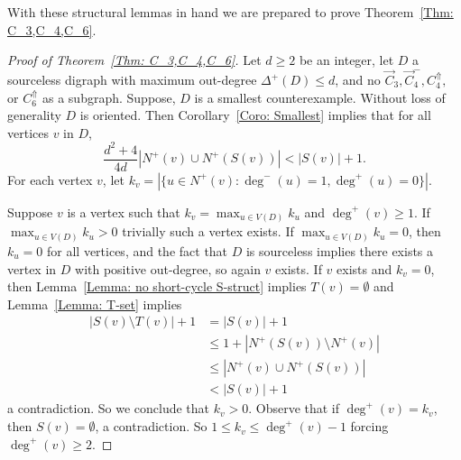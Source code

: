 \documentclass[12pt]{article}
\theoremstyle{definition}
\begin{document}
With these structural lemmas in hand we are prepared to prove Theorem~\ref{Thm: C_3,C_4,C_6}.

\begin{proof}[Proof of Theorem~\ref{Thm: C_3,C_4,C_6}]
    Let $d\geq 2$ be an integer,
    let $D$ a sourceless digraph with maximum out-degree $\Delta^+(D) \leq d$, and no $\Vec{C}_3, \Vec{C}^{-}_4,C_4^{\Uparrow},$ or $C_6^{\Uparrow}$ as a subgraph.
    Suppose, $D$ is a smallest counterexample.
    Without loss of generality $D$ is oriented.
    Then Corollary~\ref{Coro: Smallest}
    implies that 
    for all vertices $v$ in $D$,
    \[
    \frac{d^2+4}{4d}|N^+(v) \cup N^+(S(v))| < |S(v)|+1.
    \]
    For each vertex $v$, let $k_v  = |\{u \in N^+(v): \deg^-(u) = 1, \deg^+(u) = 0\}|$.

    Suppose $v$ is a vertex such that $k_v = \max_{u\in V(D)} k_u$ and $\deg^+(v)\geq 1$.
    If $\max_{u\in V(D)} k_u > 0$ trivially such a vertex exists.
    If $\max_{u\in V(D)} k_u = 0$, then $k_u = 0$ for all vertices, and the fact that $D$ is sourceless implies
    there exists a vertex in $D$ with positive out-degree, so again $v$ exists.
    If $v$ exists and $k_v = 0$, 
    then Lemma~\ref{Lemma: no short-cycle S-struct}
    implies $T(v) = \emptyset$ and Lemma~\ref{Lemma: T-set} implies
    \begin{align*}
        |S(v)\setminus T(v) |+1 &= |S(v)|+1 \\
        & \leq 1+|N^+(S(v))\setminus N^+(v)| \\
        & \leq |N^+(v) \cup N^+(S(v))| \\
        &< |S(v)|+1
    \end{align*}
    a contradiction. So we conclude that $k_ v > 0$. 
    Observe that if $\deg^+(v) = k_v$, then $S(v) = \emptyset$, a contradiction.
    So $1 \leq k_v \leq \deg^+(v)-1$ forcing $\deg^+(v)\geq 2$.


\end{proof}
\end{document}
